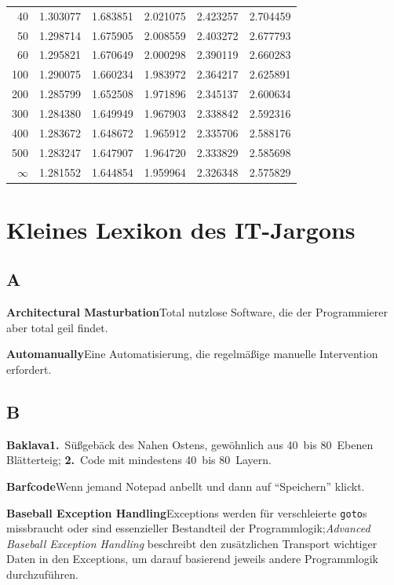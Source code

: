 \documentclass[english,ngerman,fontsize=9pt,intoc,index=totoc,refpage,listof=totoc,draft]{scrbook}
\providecommand{\tabularnewline}{\\}
\numberwithin{equation}{section}
\newcommand{\code}[1]{\texttt{#1}}
\begin{document}
\begin{center}
\begin{longtable}{r|rrrrr}
\rowcolor{lightgray}
40 & 1.303077 & 1.683851 & 2.021075 & 2.423257 & 2.704459\tabularnewline
50 & 1.298714 & 1.675905 & 2.008559 & 2.403272 & 2.677793\tabularnewline
\rowcolor{lightgray}
60 & 1.295821 & 1.670649 & 2.000298 & 2.390119 & 2.660283\tabularnewline
100 & 1.290075 & 1.660234 & 1.983972 & 2.364217 & 2.625891\tabularnewline
\rowcolor{lightgray}
200 & 1.285799 & 1.652508 & 1.971896 & 2.345137 & 2.600634\tabularnewline
300 & 1.284380 & 1.649949 & 1.967903 & 2.338842 & 2.592316\tabularnewline
\rowcolor{lightgray}
400 & 1.283672 & 1.648672 & 1.965912 & 2.335706 & 2.588176\tabularnewline
500 & 1.283247 & 1.647907 & 1.964720 & 2.333829 & 2.585698\tabularnewline
\rowcolor{lightgray}
$\infty$ & 1.281552 & 1.644854 & 1.959964 & 2.326348 & 2.575829\tabularnewline
\end{longtable}
\end{center}


\chapter{Kleines Lexikon des IT-Jargons}

\newcommand{\jargon}[2]{{\bfseries #1}\quad#2}

\section*{A}

\jargon{Architectural Masturbation}{Total nutzlose Software, die der Programmierer aber total geil findet.}

\jargon{Automanually}{Eine Automatisierung, die regelmäßige manuelle Intervention erfordert.}

\section*{B}

\jargon{Baklava}{\textbf{1.}~Süßgebäck des Nahen Ostens, gewöhnlich aus 40~bis 80~Ebenen Blätterteig; \quad\textbf{2.}~Code mit mindestens 40~bis 80~Layern.}

\jargon{Barfcode}{Wenn jemand Notepad anbellt und dann auf \enquote{Speichern} klickt.}

\jargon{Baseball Exception Handling}{Exceptions werden für verschleierte \code{goto}s missbraucht oder sind essenzieller Bestandteil der Programmlogik;\quad\emph{Advanced Baseball Exception Handling} beschreibt den zusätzlichen Transport wichtiger Daten in den Exceptions, um darauf basierend jeweils andere Programmlogik durchzuführen.}
\end{document}
